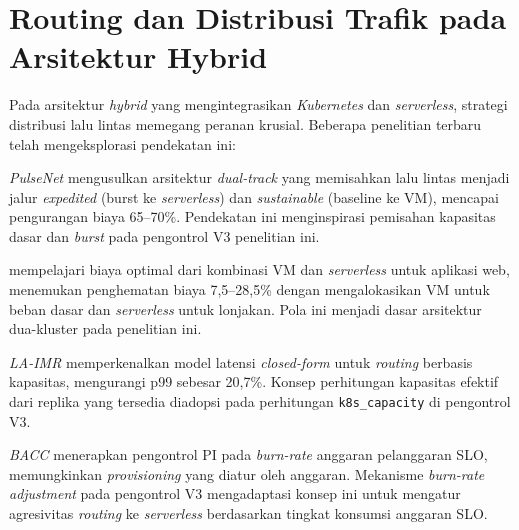 \section{Routing dan Distribusi Trafik pada Arsitektur Hybrid}
\label{sec:routing-distribusi}

Pada arsitektur \emph{hybrid} yang mengintegrasikan \emph{Kubernetes} dan \emph{serverless}, strategi distribusi lalu lintas memegang peranan krusial. Beberapa penelitian terbaru telah mengeksplorasi pendekatan ini:

\emph{PulseNet} \citep{pulsenet2025} mengusulkan arsitektur \emph{dual-track} yang memisahkan lalu lintas menjadi jalur \emph{expedited} (burst ke \emph{serverless}) dan \emph{sustainable} (baseline ke VM), mencapai pengurangan biaya 65--70\%. Pendekatan ini menginspirasi pemisahan kapasitas dasar dan \emph{burst} pada pengontrol V3 penelitian ini.

\citet{dehigama2024} mempelajari biaya optimal dari kombinasi VM dan \emph{serverless} untuk aplikasi web, menemukan penghematan biaya 7,5--28,5\% dengan mengalokasikan VM untuk beban dasar dan \emph{serverless} untuk lonjakan. Pola ini menjadi dasar arsitektur dua-kluster pada penelitian ini.

\emph{LA-IMR} \citep{laimr2026} memperkenalkan model latensi \emph{closed-form} untuk \emph{routing} berbasis kapasitas, mengurangi p99 sebesar 20,7\%. Konsep perhitungan kapasitas efektif dari replika yang tersedia diadopsi pada perhitungan \texttt{k8s\_capacity} di pengontrol V3.

\emph{BACC} \citep{bacc2026} menerapkan pengontrol PI pada \emph{burn-rate} anggaran pelanggaran SLO, memungkinkan \emph{provisioning} yang diatur oleh anggaran. Mekanisme \emph{burn-rate adjustment} pada pengontrol V3 mengadaptasi konsep ini untuk mengatur agresivitas \emph{routing} ke \emph{serverless} berdasarkan tingkat konsumsi anggaran SLO.